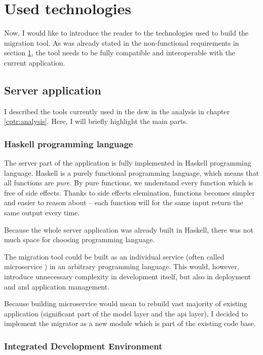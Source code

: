 \section{Used technologies}\label{sec:used-technologies}

Now, I would like to introduce the reader to the technologies used to build the migration tool.
As was already stated in the non-functional requirements in section \ref{sec:used-technologies}, the tool needs to be fully compatible and interoperable with the current application.

\subsection{Server application}

I described the tools currently used in the \gls{dsw} in the analysis in chapter \ref{cptr:analysis}.
Here, I will briefly highlight the main parts.

\subsubsection*{Haskell programming language}

The server part of the application is fully implemented in Haskell programming language.
Haskell is a purely functional programming language, which means that all functions are \textit{pure}\cite{haskell-web}.
By pure functions, we understand every function which is free of side effects.
Thanks to side effects elemination, functions becomes simpler and easier to reason about -- each function will for the same input return the same output every time.

Because the whole server application was already built in Haskell, there was not much space for choosing programming language.

The migration tool could be built as an individual service (often called microservice \cite{micros-web}) in an arbitrary programming language.
This would, however, introduce unnecessary complexity in development itself, but also in deployment and and application management.

Because building microservice would mean to rebuild vast majority of existing application (significant part of the model layer and the \gls{api} layer), I decided to implement the migrator as a new module which is part of the existing code base.

\subsubsection*{Integrated Development Environment}

